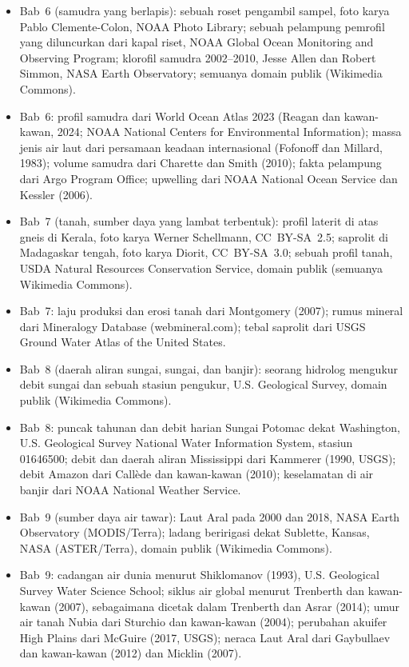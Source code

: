 \begin{itemize}
  \item Bab~6 (samudra yang berlapis): sebuah roset pengambil sampel, foto karya Pablo Clemente-Colon, NOAA Photo Library; sebuah pelampung pemrofil yang diluncurkan dari kapal riset, NOAA Global Ocean Monitoring and Observing Program; klorofil samudra 2002--2010, Jesse Allen dan Robert Simmon, NASA Earth Observatory; semuanya domain publik (Wikimedia Commons).
  \item Bab~6: profil samudra dari World Ocean Atlas 2023 (Reagan dan kawan-kawan, 2024; NOAA National Centers for Environmental Information); massa jenis air laut dari persamaan keadaan internasional (Fofonoff dan Millard, 1983); volume samudra dari Charette dan Smith (2010); fakta pelampung dari Argo Program Office; upwelling dari NOAA National Ocean Service dan Kessler (2006).
  \item Bab~7 (tanah, sumber daya yang lambat terbentuk): profil laterit di atas gneis di Kerala, foto karya Werner Schellmann, CC~BY-SA~2.5; saprolit di Madagaskar tengah, foto karya Diorit, CC~BY-SA~3.0; sebuah profil tanah, USDA Natural Resources Conservation Service, domain publik (semuanya Wikimedia Commons).
  \item Bab~7: laju produksi dan erosi tanah dari Montgomery (2007); rumus mineral dari Mineralogy Database (webmineral.com); tebal saprolit dari USGS Ground Water Atlas of the United States.
  \item Bab~8 (daerah aliran sungai, sungai, dan banjir): seorang hidrolog mengukur debit sungai dan sebuah stasiun pengukur, U.S. Geological Survey, domain publik (Wikimedia Commons).
  \item Bab~8: puncak tahunan dan debit harian Sungai Potomac dekat Washington, U.S. Geological Survey National Water Information System, stasiun 01646500; debit dan daerah aliran Mississippi dari Kammerer (1990, USGS); debit Amazon dari Callède dan kawan-kawan (2010); keselamatan di air banjir dari NOAA National Weather Service.
  \item Bab~9 (sumber daya air tawar): Laut Aral pada 2000 dan 2018, NASA Earth Observatory (MODIS/Terra); ladang beririgasi dekat Sublette, Kansas, NASA (ASTER/Terra), domain publik (Wikimedia Commons).
  \item Bab~9: cadangan air dunia menurut Shiklomanov (1993), U.S. Geological Survey Water Science School; siklus air global menurut Trenberth dan kawan-kawan (2007), sebagaimana dicetak dalam Trenberth dan Asrar (2014); umur air tanah Nubia dari Sturchio dan kawan-kawan (2004); perubahan akuifer High Plains dari McGuire (2017, USGS); neraca Laut Aral dari Gaybullaev dan kawan-kawan (2012) dan Micklin (2007).

\end{itemize}
